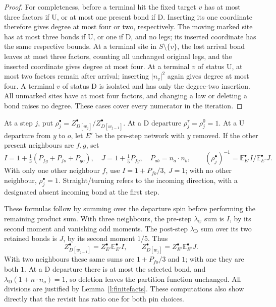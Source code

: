 \begin{proof}
For completeness, before a terminal hit the fixed target \(v\)
has at most three factors if \(\mathrm U\), or at most one
present bond if \(\mathrm D\). Inserting its one coordinate
therefore gives degree at most four or two, respectively.
The moving marked site has at most three bonds if \(\mathrm U\),
or one if \(\mathrm D\), and no legs; its inserted coordinate
has the same respective bounds. At a terminal site in
\(S\setminus\{v\}\), the lost arrival bond leaves at most three
factors, counting all unchanged original legs, and the inserted
coordinate gives degree at most four. At a terminal \(v\) of
status \(\mathrm U\), at most two factors remain after arrival;
inserting \(|n_v|^2\) again gives degree at most four.
A terminal \(v\) of status \(\mathrm D\) is isolated and has
only the degree-two insertion. All unmarked sites have at most
four factors, and changing a law or deleting a bond raises no
degree. These cases cover every numerator in the iteration.
\end{proof}

\begin{definition}\label{d:ratios}
At a step \(j\), put
\(\rho_j^\bullet=Z^\bullet_{D[w_j]}/Z^\bullet_{D[w_{j-1}]}\).
At a \(\mathrm D\) departure \(\rho_j^\tau=\rho_j^0=1\).
At a \(\mathrm U\) departure from \(y\) to \(o\), let \(E'\)
be the pre-step network with \(y\) removed.
If the other present neighbours are \(f,g\), set
\[
 I=1+\tfrac13(P_{fg}+P_{fo}+P_{go}),\quad
 J=1+\tfrac15P_{fg},\quad P_{ab}=n_a\cdot n_b,\qquad
 (\rho_j^\bullet)^{-1}=\mathbb E_{E'}^\bullet I/
                                      \mathbb E_{E'}^\bullet J.
\]
With only one other neighbour \(f\), use \(I=1+P_{fo}/3,\ J=1\);
with no other neighbour, \(\rho_j^\bullet=1\).
Straight/turning refers to the incoming direction, with a designated
absent incoming bond at the first step.
\end{definition}

These formulas follow by summing over the departure spin before
performing the remaining product sum. With three neighbours, the
pre-step \(\lambda_{\mathrm U}\) sum is \(I\), by its second
moment and vanishing odd moments. The post-step
\(\lambda_{\mathrm D}\) sum over its two retained bonds is \(J\),
by its second moment \(1/5\). Thus
\[
 Z^\bullet_{D[w_{j-1}]}=Z^\bullet_{E'}\mathbb E^\bullet_{E'}I,
 \qquad
 Z^\bullet_{D[w_j]}=Z^\bullet_{E'}\mathbb E^\bullet_{E'}J.
\]
With two neighbours these same sums are \(1+P_{fo}/3\) and \(1\);
with one they are both \(1\). At a \(\mathrm D\) departure
there is at most the selected bond, and
\(\lambda_{\mathrm D}(1+n\cdot n_o)=1\), so deletion leaves
the partition function unchanged. All divisions are justified by
Lemma~\ref{l:finitefacts}. These computations also show directly
that the revisit has ratio one for both pin choices.

